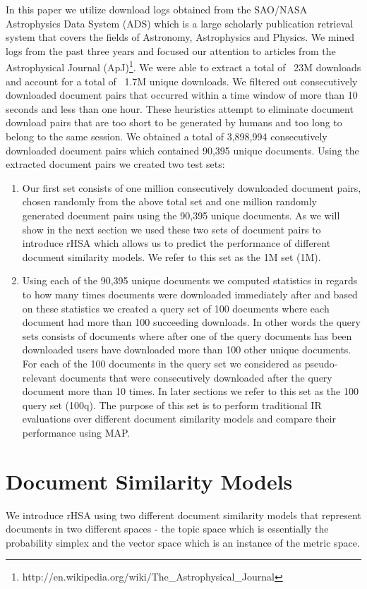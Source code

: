 \documentclass[letterpaper]{article}
\begin{document}
In this paper we utilize download logs obtained from the SAO/NASA Astrophysics Data System (ADS) \cite{Kurtz} which is a large scholarly publication retrieval system that covers the fields of Astronomy, Astrophysics and Physics. We mined logs from the past three years and focused our attention to articles from the Astrophysical Journal (ApJ)\footnote{http://en.wikipedia.org/wiki/The\_Astrophysical\_Journal}. We were able to extract a total of ~23M downloads and account for a total of ~1.7M unique downloads. We filtered out consecutively downloaded document pairs that occurred within a time window of more than 10 seconds and less than one hour. These heuristics attempt to eliminate document download pairs that are too short to be generated by humans and too long to belong to the same session. We obtained a total of 3,898,994 consecutively downloaded document pairs which contained 90,395 unique documents. Using the extracted document pairs we created two test sets:
\begin{enumerate}
\item Our first set consists of one million consecutively downloaded document pairs, chosen randomly from the above total set and one million randomly generated document pairs using the 90,395 unique documents. As we will show in the next section we used these two sets of document pairs to introduce rHSA which allows us to predict the performance of different document similarity models. We refer to this set as the 1M set (1M).
\item Using each of the 90,395 unique documents we computed statistics in regards to how many times documents were downloaded immediately after and based on these statistics we created a query set of 100 documents where each document had more than 100 succeeding downloads. In other words the query sets consists of documents where after one of the query documents has been downloaded users have downloaded more than 100 other unique documents. For each of the 100 documents in the query set we considered as pseudo-relevant documents that were consecutively downloaded after the query document more than 10 times. In later sections we refer to this set as the 100 query set (100q). The purpose of this set is to perform traditional IR evaluations over different document similarity models and compare their performance using MAP. 
\end{enumerate}
\section{Document Similarity Models}
We introduce rHSA using two different document similarity models that represent documents in two different spaces - the topic space which is essentially the probability simplex and the vector space which is an instance of the metric space.
\end{document}
